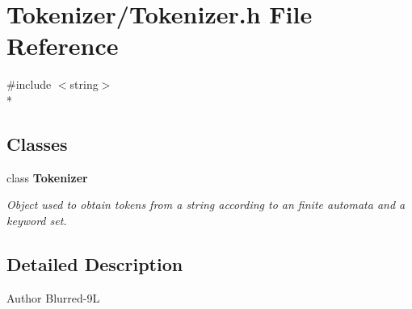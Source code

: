 \section{Tokenizer/\-Tokenizer.h File Reference}
\label{_tokenizer_8h}
{\ttfamily \#include $<$string$>$}\\*
\subsection*{Classes}
\begin{DoxyCompactItemize}
\item 
class {\bf Tokenizer}
\begin{DoxyCompactList}\small\item\em Object used to obtain tokens from a string according to an finite automata and a keyword set. \end{DoxyCompactList}\end{DoxyCompactItemize}


\subsection{Detailed Description}
\begin{DoxyAuthor}{Author}
Blurred-\/9\-L 
\end{DoxyAuthor}
